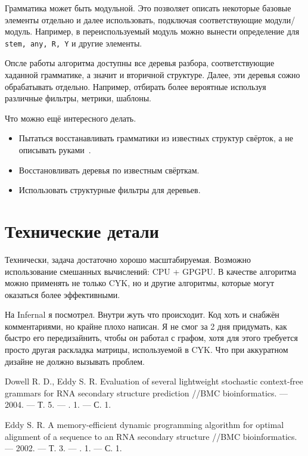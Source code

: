 \documentclass[a5paper]{article}
\begin{document}
Грамматика может быть модульной. Это позволяет описать некоторые базовые элементы отдельно и далее 
использовать, подключая соответствующие модули/модуль. Например, в переиспользуемый модуль можно 
вынести определение для \texttt{stem, any, R, Y} и другие элементы.

Опсле работы алгоритма доступны все деревья разбора, соответствующие хаданной грамматике, а значит 
и вторичной структуре. Далее, эти деревья сожно обрабатывать отдельно. Например, отбирать более 
вероятные используя различные фильтры, метрики, шаблоны. 

Что можно ещё интересного делать.
\begin{itemize} 
\item Пытаться восстанавливать грамматики из известных структур свёрток, а не описывать руками~\cite{SCFGRNA1}.
\item Восстановливать деревья по известным свёрткам.
\item Использовать структурные фильтры для деревьев.
\end{itemize}

\section{Технические детали}
Технически, задача достаточно хорошо масштабируемая. Возможно использование смешанных вычислений: CPU + GPGPU. В качестве алгоритма можно применять не только CYK, но и другие 
алгоритмы, которые могут оказаться более эффективными.

На Infernal я посмотрел. Внутри жуть что происходит. Код хоть и снабжён комментариями, но крайне плохо написан. Я не смог за 2 дня придумать, как быстро его передизайнить, чтобы он работал с графом, 
хотя для этого требуется просто другая раскладка матрицы, используемой в CYK. Что при аккуратном 
дизайне не должно вызывать проблем.


%


\begin{thebibliography}{99}
  
Dowell R. D., Eddy S. R. Evaluation of several lightweight stochastic context-free grammars for RNA 
secondary structure prediction //BMC bioinformatics. --- 2004. --- Т. 5. --- \textnumero. 1. --- С. 1.

Eddy S. R. A memory-efficient dynamic programming algorithm for optimal alignment of a sequence to 
an RNA secondary structure //BMC bioinformatics. --- 2002. --- Т. 3. --- \textnumero. 1. --- С. 1.
\end{thebibliography}
\end{document}
